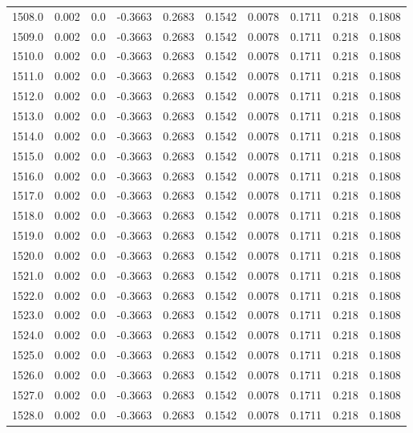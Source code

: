 \begin{longtable}{lrrrrrrrrr}
1508.0 & 0.002 & 0.0 & -0.3663 & 0.2683 & 0.1542 & 0.0078 & 0.1711 & 0.218 & 0.1808 \\
1509.0 & 0.002 & 0.0 & -0.3663 & 0.2683 & 0.1542 & 0.0078 & 0.1711 & 0.218 & 0.1808 \\
1510.0 & 0.002 & 0.0 & -0.3663 & 0.2683 & 0.1542 & 0.0078 & 0.1711 & 0.218 & 0.1808 \\
1511.0 & 0.002 & 0.0 & -0.3663 & 0.2683 & 0.1542 & 0.0078 & 0.1711 & 0.218 & 0.1808 \\
1512.0 & 0.002 & 0.0 & -0.3663 & 0.2683 & 0.1542 & 0.0078 & 0.1711 & 0.218 & 0.1808 \\
1513.0 & 0.002 & 0.0 & -0.3663 & 0.2683 & 0.1542 & 0.0078 & 0.1711 & 0.218 & 0.1808 \\
1514.0 & 0.002 & 0.0 & -0.3663 & 0.2683 & 0.1542 & 0.0078 & 0.1711 & 0.218 & 0.1808 \\
1515.0 & 0.002 & 0.0 & -0.3663 & 0.2683 & 0.1542 & 0.0078 & 0.1711 & 0.218 & 0.1808 \\
1516.0 & 0.002 & 0.0 & -0.3663 & 0.2683 & 0.1542 & 0.0078 & 0.1711 & 0.218 & 0.1808 \\
1517.0 & 0.002 & 0.0 & -0.3663 & 0.2683 & 0.1542 & 0.0078 & 0.1711 & 0.218 & 0.1808 \\
1518.0 & 0.002 & 0.0 & -0.3663 & 0.2683 & 0.1542 & 0.0078 & 0.1711 & 0.218 & 0.1808 \\
1519.0 & 0.002 & 0.0 & -0.3663 & 0.2683 & 0.1542 & 0.0078 & 0.1711 & 0.218 & 0.1808 \\
1520.0 & 0.002 & 0.0 & -0.3663 & 0.2683 & 0.1542 & 0.0078 & 0.1711 & 0.218 & 0.1808 \\
1521.0 & 0.002 & 0.0 & -0.3663 & 0.2683 & 0.1542 & 0.0078 & 0.1711 & 0.218 & 0.1808 \\
1522.0 & 0.002 & 0.0 & -0.3663 & 0.2683 & 0.1542 & 0.0078 & 0.1711 & 0.218 & 0.1808 \\
1523.0 & 0.002 & 0.0 & -0.3663 & 0.2683 & 0.1542 & 0.0078 & 0.1711 & 0.218 & 0.1808 \\
1524.0 & 0.002 & 0.0 & -0.3663 & 0.2683 & 0.1542 & 0.0078 & 0.1711 & 0.218 & 0.1808 \\
1525.0 & 0.002 & 0.0 & -0.3663 & 0.2683 & 0.1542 & 0.0078 & 0.1711 & 0.218 & 0.1808 \\
1526.0 & 0.002 & 0.0 & -0.3663 & 0.2683 & 0.1542 & 0.0078 & 0.1711 & 0.218 & 0.1808 \\
1527.0 & 0.002 & 0.0 & -0.3663 & 0.2683 & 0.1542 & 0.0078 & 0.1711 & 0.218 & 0.1808 \\
1528.0 & 0.002 & 0.0 & -0.3663 & 0.2683 & 0.1542 & 0.0078 & 0.1711 & 0.218 & 0.1808 \\

\end{longtable}
